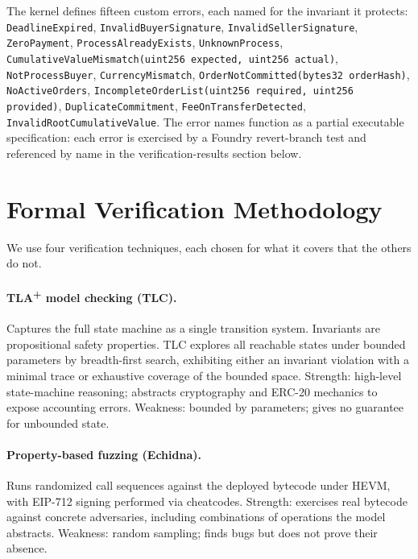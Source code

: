 \documentclass[11pt,a4paper]{article}
\theoremstyle{definition}
\theoremstyle{remark}
\begin{document}
The kernel defines fifteen custom errors, each named for the
invariant it protects: \texttt{DeadlineExpired},
\texttt{InvalidBuyerSignature}, \texttt{InvalidSellerSignature},
\texttt{ZeroPayment}, \texttt{ProcessAlreadyExists},
\texttt{UnknownProcess}, \texttt{CumulativeValueMismatch(uint256
expected, uint256 actual)}, \texttt{NotProcessBuyer},
\texttt{CurrencyMismatch}, \texttt{OrderNotCommitted(bytes32
orderHash)}, \texttt{NoActiveOrders},
\texttt{IncompleteOrderList(uint256 required, uint256 provided)},
\texttt{DuplicateCommitment}, \texttt{FeeOnTransferDetected},
\texttt{InvalidRootCumulativeValue}.
The error names function as a partial executable specification:
each error is exercised by a Foundry revert-branch test and
referenced by name in the verification-results section below.

\section{Formal Verification Methodology}
\label{sec:verification-method}

We use four verification techniques, each chosen for what it covers
that the others do not.

\paragraph{TLA\textsuperscript{+} model checking (TLC).}
Captures the full state machine as a single transition system.
Invariants are propositional safety properties. TLC explores all
reachable states under bounded parameters by breadth-first search,
exhibiting either an invariant violation with a minimal trace or
exhaustive coverage of the bounded space. Strength: high-level
state-machine reasoning; abstracts cryptography and ERC-20 mechanics
to expose accounting errors. Weakness: bounded by parameters; gives
no guarantee for unbounded state.

\paragraph{Property-based fuzzing (Echidna).}
Runs randomized call sequences against the deployed bytecode under
HEVM, with EIP-712 signing performed via cheatcodes. Strength:
exercises real bytecode against concrete adversaries, including
combinations of operations the model abstracts. Weakness: random
sampling; finds bugs but does not prove their absence.
\end{document}
